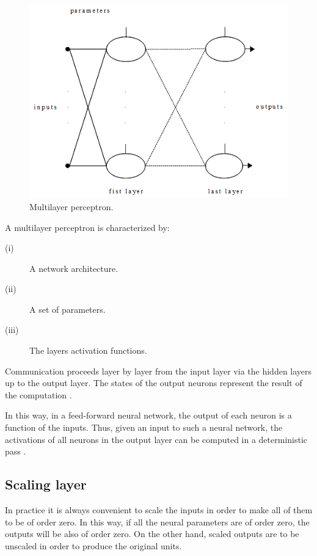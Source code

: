 \begin{figure}[h!]
\begin{center}
\includegraphics[width=1.1\textwidth]{neural_network/multilayer_perceptron}
\caption{Multilayer perceptron.}\label{MultilayerPerceptronFigure}
\end{center}
\end{figure}

A multilayer perceptron is characterized by:

\begin{description}
\item[(i)] A network architecture.
\item[(ii)] A set of parameters.
\item[(iii)] The layers activation functions.
\end{description}

Communication proceeds layer by layer
from the input layer via the hidden layers up to the output layer.
The states of the output neurons represent the result of the
computation \cite{Sima2003}.

In this way, in a feed-forward neural network, the output of each
neuron is a function of the inputs. Thus, given an input to such a
neural network, the activations of all neurons in the output layer
can be computed in a deterministic pass \cite{Bishop1995}.

\subsection*{Scaling layer}

In practice it is always convenient to scale the inputs in order to make all of them to be of order zero.
In this way, if all the neural parameters are of order zero, the
outputs will be also of order zero. On the other hand, scaled outputs are to be unscaled in order to produce the original units.

